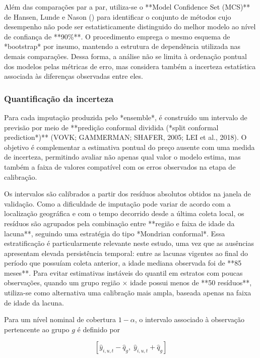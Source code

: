 Além das comparações par a par, utiliza-se o **Model Confidence Set (MCS)** de Hansen, Lunde e Nason () para identificar 
o conjunto de métodos cujo desempenho não pode ser estatisticamente distinguido do melhor modelo ao nível de confiança 
de **90\%**. O procedimento emprega o mesmo esquema de *bootstrap* por insumo, mantendo a estrutura de dependência utilizada 
nas demais comparações. Dessa forma, a análise não se limita à ordenação pontual dos modelos pelas métricas de erro, mas 
considera também a incerteza estatística associada às diferenças observadas entre eles.

\subsubsection{Quantificação da incerteza}

Para cada imputação produzida pelo *ensemble*, é construído um intervalo de previsão por meio de **predição conformal dividida 
(*split conformal prediction*)** (VOVK; GAMMERMAN; SHAFER, 2005; LEI et al., 2018). O objetivo é complementar a estimativa 
pontual do preço ausente com uma medida de incerteza, permitindo avaliar não apenas qual valor o modelo estima, mas também 
a faixa de valores compatível com os erros observados na etapa de calibração.

Os intervalos são calibrados a partir dos resíduos absolutos obtidos na janela de validação. Como a dificuldade de imputação 
pode variar de acordo com a localização geográfica e com o tempo decorrido desde a última coleta local, os resíduos são agrupados 
pela combinação entre **região e faixa de idade da lacuna**, seguindo uma estratégia do tipo *Mondrian conformal*. 
Essa estratificação é particularmente relevante neste estudo, uma vez que as ausências apresentam elevada persistência temporal: 
entre as lacunas vigentes ao final do período que possuíam coleta anterior, a idade mediana observada foi de **85 meses**. 
Para evitar estimativas instáveis do quantil em estratos com poucas observações, quando um grupo região × idade possui menos de 
**50 resíduos**, utiliza-se como alternativa uma calibração mais ampla, baseada apenas na faixa de idade da lacuna.

Para um nível nominal de cobertura \(1-\alpha\), o intervalo associado à observação pertencente ao grupo \(g\) é definido por

\begin{equation} \left[ \widehat{y}_{i,u,t} - \widehat{q}_{g}, \; \widehat{y}_{i,u,t} + \widehat{q}_{g} \right] \label{eq:intervalo-conformal} \end{equation}

